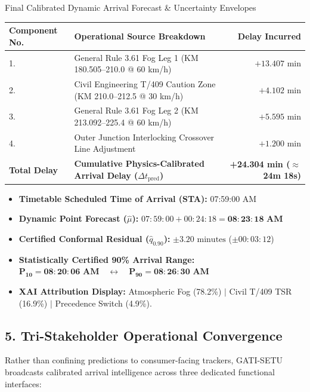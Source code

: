 \documentclass[10pt, a4paper]{article}
\begin{document}
\begin{jurybox}{Final Calibrated Dynamic Arrival Forecast \& Uncertainty Envelopes}
  \begin{center}
  \renewcommand{\arraystretch}{1.1}
  \begin{tabular}{llr}
    \toprule
    \textbf{Component No.} & \textbf{Operational Source Breakdown} & \textbf{Delay Incurred} \\
    \midrule
    1. & General Rule 3.61 Fog Leg 1 (KM 180.505--210.0 @ 60 km/h) & $+13.407\text{ min}$ \\
    2. & Civil Engineering T/409 Caution Zone (KM 210.0--212.5 @ 30 km/h) & $+4.102\text{ min}$ \\
    3. & General Rule 3.61 Fog Leg 2 (KM 213.092--225.4 @ 60 km/h) & $+5.595\text{ min}$ \\
    4. & Outer Junction Interlocking Crossover Line Adjustment & $+1.200\text{ min}$ \\
    \midrule
    \textbf{Total Delay} & \textbf{Cumulative Physics-Calibrated Arrival Delay ($\Delta t_{\text{pred}}$)} & \textbf{+24.304 min ($\approx$ 24m 18s)} \\
    \bottomrule
  \end{tabular}
  \end{center}

  \begin{itemize}[leftmargin=4mm, itemsep=2pt]
    \item \textbf{Timetable Scheduled Time of Arrival (STA):} 07:59:00 AM
    \item \textbf{Dynamic Point Forecast ($\hat{\mu}$):} $07:59:00 + 00:24:18 = \mathbf{08:23:18\text{ AM}}$
    \item \textbf{Certified Conformal Residual ($\hat{q}_{0.90}$):} $\pm 3.20\text{ minutes}$ ($\pm 00:03:12$)
    \item \textbf{Statistically Certified 90\% Arrival Range:} $\mathbf{P_{10} = 08:20:06\text{ AM}} \quad\longleftrightarrow\quad \mathbf{P_{90} = 08:26:30\text{ AM}}$
    \item \textbf{XAI Attribution Display:} Atmospheric Fog (78.2\%) $\vert$ Civil T/409 TSR (16.9\%) $\vert$ Precedence Switch (4.9\%).
  \end{itemize}
\end{jurybox}

\subsection*{5. Tri-Stakeholder Operational Convergence}
Rather than confining predictions to consumer-facing trackers, GATI-SETU broadcasts calibrated arrival intelligence across three dedicated functional interfaces:
\end{document}
